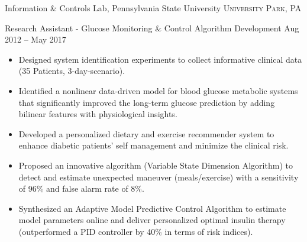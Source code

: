 \documentclass[10pt,a4paper]{article}
\begin{document}
\headedsection
{Information \& Controls Lab, Pennsylvania State University}
{\textsc{University Park, PA}}
  {
    \headedsubsection
    {Research Assistant - Glucose Monitoring \& Control Algorithm Development}
    {Aug 2012 -- May 2017}
    {\vspace{0.1em}
      \begin{itemize}
        \setlength{\itemsep}{0.3em}
      \item Designed system identification experiments
        to collect informative clinical data (35 Patients, 3-day-scenario).

      \item Identified a nonlinear data-driven model for blood glucose metabolic
        systems that significantly improved the long-term glucose prediction by adding bilinear features with physiological insights.
      
      \item Developed a personalized dietary and exercise recommender system to
        enhance diabetic patients' self management and minimize the clinical risk.  
      \item Proposed an innovative algorithm (Variable State Dimension
        Algorithm) to detect and estimate unexpected maneuver (meals/exercise) with a
        sensitivity of 96\% and false alarm rate of 8\%.
        
        

      \item Synthesized an Adaptive Model Predictive Control Algorithm to estimate
        model parameters online and deliver personalized optimal insulin therapy
        (outperformed a PID controller by 40\% in terms of risk indices).
        


\end{itemize}}}
\end{document}
